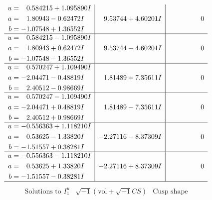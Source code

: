 \documentclass[1p]{elsarticle_modified}
\theoremstyle{definition}
\newcommand{\I}{\sqrt{-1}}
\begin{document}
$$\begin{array}{c|c|c}
\begin{aligned}
u &= \phantom{-}0.584215 + 1.095890 I \\
a &= \phantom{-}1.80943 - 0.62472 I \\
b &= -1.07548 + 1.36552 I\end{aligned}
 & \phantom{-}9.53744 + 4.60201 I & \phantom{-0.000000 } 0 \\ \hline\begin{aligned}
u &= \phantom{-}0.584215 - 1.095890 I \\
a &= \phantom{-}1.80943 + 0.62472 I \\
b &= -1.07548 - 1.36552 I\end{aligned}
 & \phantom{-}9.53744 - 4.60201 I & \phantom{-0.000000 } 0 \\ \hline\begin{aligned}
u &= \phantom{-}0.570247 + 1.109490 I \\
a &= -2.04471 - 0.48819 I \\
b &= \phantom{-}2.40512 - 0.98669 I\end{aligned}
 & \phantom{-}1.81489 + 7.35611 I & \phantom{-0.000000 } 0 \\ \hline\begin{aligned}
u &= \phantom{-}0.570247 - 1.109490 I \\
a &= -2.04471 + 0.48819 I \\
b &= \phantom{-}2.40512 + 0.98669 I\end{aligned}
 & \phantom{-}1.81489 - 7.35611 I & \phantom{-0.000000 } 0 \\ \hline\begin{aligned}
u &= -0.556363 + 1.118210 I \\
a &= \phantom{-}0.53625 - 1.33820 I \\
b &= -1.51557 + 0.38281 I\end{aligned}
 & -2.27116 - 8.37309 I & \phantom{-0.000000 } 0 \\ \hline\begin{aligned}
u &= -0.556363 - 1.118210 I \\
a &= \phantom{-}0.53625 + 1.33820 I \\
b &= -1.51557 - 0.38281 I\end{aligned}
 & -2.27116 + 8.37309 I & \phantom{-0.000000 } 0\\
 \hline 
 \end{array}$$\newpage$$\begin{array}{c|c|c}  
\text{Solutions to }I^u_{1}& \I (\text{vol} + \sqrt{-1}CS) & \text{Cusp shape}\\
 \hline 
\begin{aligned}

\end{aligned}
\end{array}$$
\end{document}
